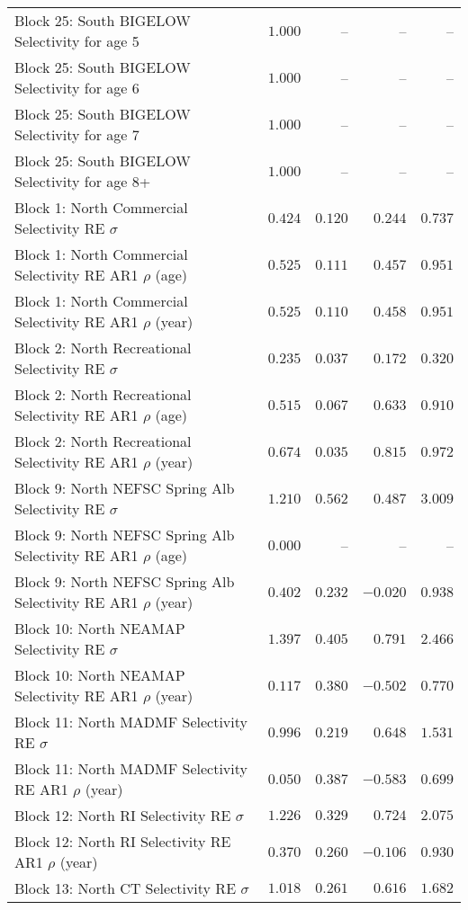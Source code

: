\documentclass[
]{article}
\begin{document}
\begin{landscape}
\begin{longtable}[t]{lrrrr}
Block 25: South BIGELOW Selectivity for age 5 & $1.000$ & -- & -- & --\\
\addlinespace
Block 25: South BIGELOW Selectivity for age 6 & $1.000$ & -- & -- & --\\
Block 25: South BIGELOW Selectivity for age 7 & $1.000$ & -- & -- & --\\
Block 25: South BIGELOW Selectivity for age 8+ & $1.000$ & -- & -- & --\\
Block 1: North Commercial Selectivity RE $\sigma$ & $0.424$ & $0.120$ & $0.244$ & $0.737$\\
Block 1: North Commercial Selectivity RE AR1 $\rho$ (age) & $0.525$ & $0.111$ & $0.457$ & $0.951$\\
\addlinespace
Block 1: North Commercial Selectivity RE AR1 $\rho$ (year) & $0.525$ & $0.110$ & $0.458$ & $0.951$\\
Block 2: North Recreational Selectivity RE $\sigma$ & $0.235$ & $0.037$ & $0.172$ & $0.320$\\
Block 2: North Recreational Selectivity RE AR1 $\rho$ (age) & $0.515$ & $0.067$ & $0.633$ & $0.910$\\
Block 2: North Recreational Selectivity RE AR1 $\rho$ (year) & $0.674$ & $0.035$ & $0.815$ & $0.972$\\
Block 9: North NEFSC Spring Alb Selectivity RE $\sigma$ & $1.210$ & $0.562$ & $0.487$ & $3.009$\\
\addlinespace
Block 9: North NEFSC Spring Alb Selectivity RE AR1 $\rho$ (age) & $0.000$ & -- & -- & --\\
Block 9: North NEFSC Spring Alb Selectivity RE AR1 $\rho$ (year) & $0.402$ & $0.232$ & $-0.020$ & $0.938$\\
Block 10: North NEAMAP Selectivity RE $\sigma$ & $1.397$ & $0.405$ & $0.791$ & $2.466$\\
Block 10: North NEAMAP Selectivity RE AR1 $\rho$ (year) & $0.117$ & $0.380$ & $-0.502$ & $0.770$\\
Block 11: North MADMF Selectivity RE $\sigma$ & $0.996$ & $0.219$ & $0.648$ & $1.531$\\
\addlinespace
Block 11: North MADMF Selectivity RE AR1 $\rho$ (year) & $0.050$ & $0.387$ & $-0.583$ & $0.699$\\
Block 12: North RI Selectivity RE $\sigma$ & $1.226$ & $0.329$ & $0.724$ & $2.075$\\
Block 12: North RI Selectivity RE AR1 $\rho$ (year) & $0.370$ & $0.260$ & $-0.106$ & $0.930$\\
Block 13: North CT Selectivity RE $\sigma$ & $1.018$ & $0.261$ & $0.616$ & $1.682$\\

\end{longtable}
\end{landscape}
\end{document}
